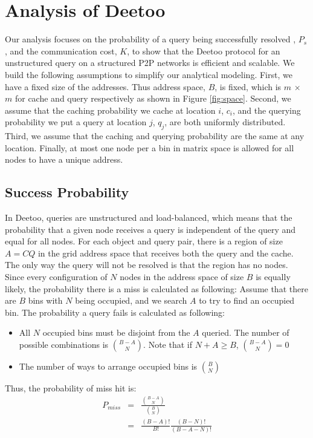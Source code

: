 \documentclass[9.5pt,journal,final,finalsubmission,twocolumn]{IEEEtran}
\begin{document}
\section{Analysis of Deetoo}\label{sec:analysis}
Our analysis focuses on the probability of a query being successfully resolved
, $P_{s}$, and the communication cost, $K$, 
to show that the Deetoo protocol for an unstructured query on a structured P2P networks
is efficient and scalable. We build the following assumptions to 
simplify our analytical modeling.
First, we have a fixed size of the addresses. Thus
address space, $B$, is fixed, which is $m$ $\times$
$m$ for cache and query respectively as shown in
Figure \ref{fig:space}. Second, we assume that the caching probability we
cache at location $i$, $c_{i}$, and the querying
probability we put a query at location $j$, $q_{j}$, are both
uniformly distributed. Third, we assume that the caching and querying
probability are the same at any location. Finally, at most one node per
a bin in matrix space is allowed for all nodes to have a unique
address.


\subsection{Success Probability}
\label{sec:suc_prob}
In Deetoo, queries are unstructured and load-balanced, which means that
the probability that a given node receives a query is independent of
the query and equal for all nodes.
For each object and query pair, there is a region of size $A=CQ$ in
the grid address space that receives both the query and the cache.
The only way the query will not be resolved is that the region has no
nodes. Since every configuration of $N$ nodes in the address space of 
size $B$ is equally likely, the probability there is a miss is 
calculated as following:
Assume that there are $B$ bins with $N$ being occupied, and we search $A$
to try to find an occupied bin. The probability a query fails is 
calculated as following:
\begin{itemize}
\item All $N$ occupied bins must be disjoint from the $A$ queried. 
The number of possible combinations is ${{B-A}\choose{N}}$. Note that
if $N+A\geq B$, ${{B-A}\choose{N}}=0$
\item The number of ways to arrange occupied bins is ${{B}\choose{N}}$
\end{itemize}
Thus, the probability of miss hit is:
\begin{eqnarray}
P_{miss} &=& \frac{{{B-A}\choose{N}}}{{{B}\choose{N}}}\\
         &=& \frac{(B-A)!}{B!}\frac{(B-N)!}{(B-A-N)!}\label{eq:pmiss_exact}
\end{eqnarray}
\end{document}
